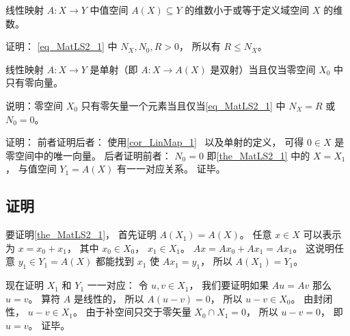 \begin{corollary}{}
线性映射 $A:X\to Y$ 中值空间 $A(X) \subseteq Y$ 的维数小于或等于定义域空间 $X$ 的维数。
\end{corollary}
证明： \autoref{eq_MatLS2_1} 中 $N_X, N_0, R > 0$， 所以有 $R \leqslant N_X$。

\begin{corollary}{}
线性映射 $A:X\to Y$ 是单射（即 $A:X\to A(X)$ 是双射）当且仅当零空间 $X_0$ 中只有零向量。
\end{corollary}
说明：零空间 $X_0$ 只有零矢量一个元素当且仅当\autoref{eq_MatLS2_1} 中 $N_X = R$ 或 $N_0 = 0$。

证明： 前者证明后者： 使用\autoref{cor_LinMap_1}~ 以及单射的定义， 可得 $0\in X$ 是零空间中的唯一向量。 后者证明前者： $N_0 = 0$ 即\autoref{the_MatLS2_1} 中的 $X = X_1$， 与值空间 $Y_1 = A(X)$ 有一一对应关系。 证毕。

\subsection{证明}
要证明\autoref{the_MatLS2_1}， 首先证明 $A(X_1) = A(X)$。 任意 $x\in X$ 可以表示为 $x = x_0 + x_1$， 其中 $x_0\in X_0$， $x_1\in X_1$。 $Ax = A x_0 + A x_1 = A x_1$。 这说明任意 $y_1 \in Y_1 = A(X)$ 都能找到 $x_1$ 使 $A x_1 = y_1$， 所以 $A(X_1) = Y_1$。

现在证明 $X_1$ 和 $Y_1$ 一一对应： 令 $u, v \in X_1$， 我们要证明如果 $Au = Av$ 那么 $u = v$。 算符 $A$ 是线性的， 所以 $A(u-v) = 0$， 所以 $u - v \in X_0$。 由封闭性， $u - v \in X_1$。 由于补空间只交于零矢量 $X_0 \cap X_1 = \qty{0}$， 所以 $u - v = 0$， 即 $u = v$。 证毕。

